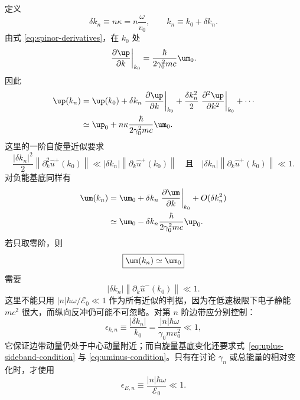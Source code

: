 定义
\begin{equation}
 \delta k_n\equiv n\kappa=n\frac{\omega}{v_0},
 \qquad
 k_n\equiv k_0+\delta k_n.
 \label{eq:kn-def}
\end{equation}
由式 \eqref{eq:spinor-derivatives}，在 $k_0$ 处
\[
 \left.\frac{\partial\up}{\partial k}\right|_{k_0}
 =\frac{\hbar}{2\gamma_0^2mc}\um_0.
\]
因此
\begin{align}
 \up(k_n)
 &=\up(k_0)+\delta k_n
 \left.\frac{\partial\up}{\partial k}\right|_{k_0}
 +\frac{\delta k_n^2}{2}
 \left.\frac{\partial^2\up}{\partial k^2}\right|_{k_0}+\cdots\\
 &\simeq
 \up_0+n\kappa\frac{\hbar}{2\gamma_0^2mc}\um_0.
 \label{eq:uplus-kn}
\end{align}
这里的一阶自旋量近似要求
\begin{equation}
 \boxed{
 \frac{|\delta k_n|^2}{2}
 \left\|\partial_k^2\widehat u^+(k_0)\right\|
 \ll
 |\delta k_n|\left\|\partial_k\widehat u^+(k_0)\right\|
 \quad\text{且}\quad
 |\delta k_n|\left\|\partial_k\widehat u^+(k_0)\right\|\ll1.}
 \label{eq:uplus-sideband-condition}
\end{equation}
对负能基底同样有
\begin{align}
 \um(k_n)
 &=\um_0+\delta k_n\left.\frac{\partial\um}{\partial k}\right|_{k_0}+O(\delta k_n^2)\\
 &\simeq
 \um_0-\delta k_n\frac{\hbar}{2\gamma_0^2mc}\up_0.
 \label{eq:uminus-kn}
\end{align}
若只取零阶，则
\begin{equation}
 \boxed{\um(k_n)\simeq\um_0}
 \label{eq:uminus-smallrange}
\end{equation}
需要
\begin{equation}
 \boxed{
 |\delta k_n|
 \left\|\partial_k\widehat u^-(k_0)\right\|
 \ll1.}
 \label{eq:uminus-condition}
\end{equation}
这里不能只用 $|n|\hbar\omega/\mathcal E_0\ll1$ 作为所有近似的判据，因为在低速极限下电子静能 $mc^2$ 很大，而纵向反冲仍可能不可忽略。对第 $n$ 阶边带应分别控制：
\begin{equation}
\boxed{
\epsilon_{k,n}\equiv\frac{|\delta k_n|}{k_0}
=\frac{|n|\hbar\omega}{\gamma_0m v_0^2}\ll1,}
\label{eq:small-sideband-k}
\end{equation}
它保证边带动量仍处于中心动量附近；而自旋量基底变化还要求式~\eqref{eq:uplus-sideband-condition} 与 \eqref{eq:uminus-condition}。只有在讨论 $\gamma_n$ 或总能量的相对变化时，才使用
\begin{equation}
\boxed{
\epsilon_{E,n}\equiv\frac{|n|\hbar\omega}{\mathcal E_0}\ll1.}
\label{eq:small-sideband-energy}
\end{equation}

